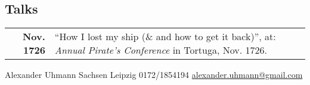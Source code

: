 \documentclass[grey]{hipstercv}
\newlength{\rightcolwidth}
\begin{document}
\begin{paracol}{2}
\begin{minipage}[t]{0.3\textwidth}
\section*{Talks}
\begin{tabular}{>{\footnotesize\bfseries}r >{\footnotesize}p{}}
    Nov. 1726 & ``How I lost my ship (\& and how to get it back)'', at: \emph{Annual Pirate's Conference} in Tortuga, Nov. 1726.
\end{tabular}
\end{minipage}









\vfill{} %

\setlength{\parindent}{0pt}
\begin{minipage}[t]{\rightcolwidth}
\begin{center}\fontfamily{\sfdefault}\selectfont \color{black!70}
{\small Alexander Uhmann  Sachsen  Leipzig  0172/1854194 \newline{} \protect\url{alexander.uhmann@gmail.com}
}
\end{center}
\end{minipage}


\end{paracol}
\end{document}
